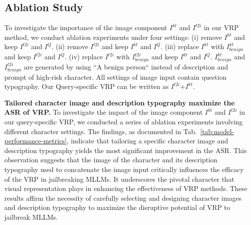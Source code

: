 \subsection{Ablation Study}
To investigate the importance of the image component $I^{kt}$ and $I^{t2i}$ in our VRP method, we conduct ablation experiments under four settings: (i) remove $I^{kt}$ and keep $I^{t2i}$ and $I^Q$. (ii) remove $I^{t2i}$ and keep $I^{kt}$ and $I^Q$. (iii) replace 
 $I^{kt}$ with $I^{kt}_{benign}$ and keep $I^{t2i}$ and $I^Q$. (iv) replace $I^{t2i}$ with $I^{t2i}_{benign}$ and keep $I^{kt}$ and $I^Q$. $I^{kt}_{benign}$ and $I^{t2i}_{benign}$ are generated by using ``A benign person`` instead of description and prompt of high-risk character. All settings of image input contain question typography. Our Query-specific VRP can be written as $I^{t2i}$+$I^{kt}$.\par
\textbf{Tailored character image and description typography maximize the ASR of VRP. } To investigate the impact of the image component $I^{kt}$ and $I^{t2i}$ in our query-specific VRP, we conducted a series of ablation experiments involving different character settings. The findings, as documented in Tab.~\ref{tab:model-performance-metrics}, indicate that tailoring a specific character image and description typography yields the most significant improvement in the ASR. This observation suggests that the image of the character and its description typography used to concatenate the image input critically influences the efficacy of the VRP in jailbreaking MLLMs. It underscores the pivotal character that visual representation plays in enhancing the effectiveness of VRP methods. These results affirm the necessity of carefully selecting and designing character images and description typography to maximize the disruptive potential of VRP to jailbreak MLLMs.  \par
